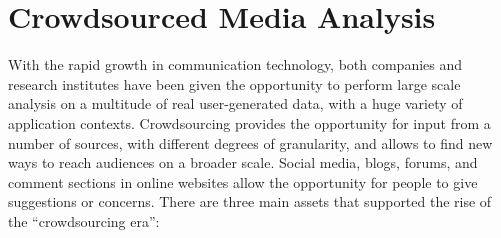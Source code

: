 \chapter{Crowdsourced Media Analysis}\label{ch2}
With the rapid growth in communication technology, both companies and research institutes have been given the opportunity to perform large scale analysis on a multitude of real user-generated data, with a huge variety of application contexts.
Crowdsourcing provides the opportunity for input from a number of sources, with different degrees of granularity, and allows to find new ways to reach audiences on a broader scale. %
Social media, blogs, forums, and comment sections in online websites allow the opportunity for people to give suggestions or concerns.
There are three main assets that supported the rise of the ``crowdsourcing era'':
